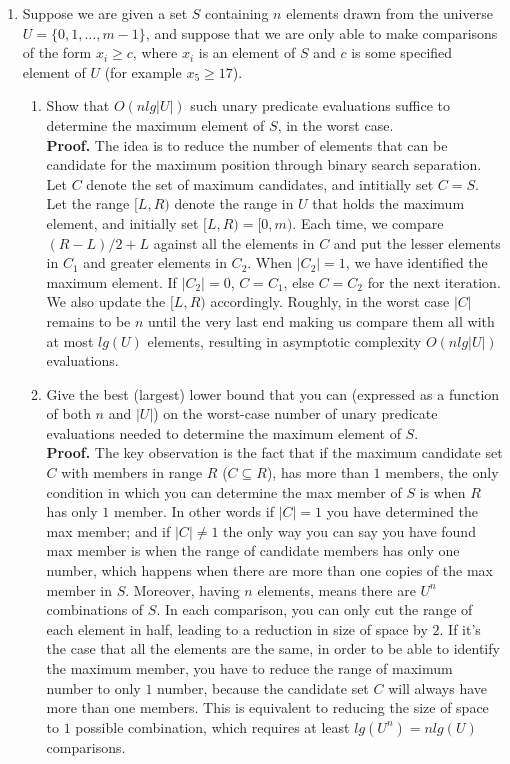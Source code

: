 \documentclass[letterpaper,12pt]{article}
\begin{document}
\begin{enumerate}
\begin{enumerate}
	\end{enumerate}
	\item Suppose we are given a set $S$ containing $n$ elements drawn from the universe $U = \{0, 1, . . . , m - 1\}$, and suppose that we are only able to make comparisons of the form $x_i \geq c$, where $x_i$ is an element of $S$ and $c$ is some specified element of $U$ (for example $x_5 \geq 17$).
	\begin{enumerate}
		\item Show that $O(n lg |U|)$ such unary predicate evaluations suffice to determine the maximum element of $S$, in the worst case.\\
		\textbf{Proof.} The idea is to reduce the number of elements that can be candidate for the maximum position through binary search separation.\\
		Let $C$ denote the set of maximum candidates, and intitially set $C=S$. Let the range $[L, R)$ denote the range in $U$ that holds the maximum element, and initially set $[L, R) = [0, m)$. Each time, we compare $(R-L)/2+L$ against all the elements in $C$ and put the lesser elements in $C_1$ and greater elements in $C_2$. When $|C_2|=1$, we have identified the maximum element. If $|C_2|=0$, $C=C_1$, else $C=C_2$ for the next iteration. We also update the $[L, R)$ accordingly. Roughly, in the worst case $|C|$ remains to be $n$ until the very last end making us compare them all with at most $lg(U)$ elements, resulting in asymptotic complexity $O(n lg |U|)$ evaluations.

	\item Give the best (largest) lower bound that you can (expressed as a function of both $n$ and $|U|$) on the worst-case number of unary predicate evaluations needed to determine the maximum element of $S$.\\
	\textbf{Proof.} The key observation is the fact that if the maximum candidate set $C$ with members in range $R$ ($C \subseteq R$), has more than $1$ members, the only condition in which you can determine the max member of $S$ is when $R$ has only $1$ member. In other words if $|C|=1$ you have determined the max member; and if $|C|\neq1$ the only way you can say you have found max member is when the range of candidate members has only one number, which happens when there are more than one copies of the max member in $S$. Moreover, having $n$ elements, means there are $U^n$ combinations of $S$. In each comparison, you can only cut the range of each element in half, leading to a reduction in size of space by $2$. If it's the case that all the elements are the same, in order to be able to identify the maximum member, you have to reduce the range of maximum number to only $1$ number, because the candidate set $C$ will always have more than one members. This is equivalent to reducing the size of space to $1$ possible combination, which requires at least $lg(U^n) = nlg(U)$ comparisons.
	\end{enumerate}


\end{enumerate}
\end{document}
